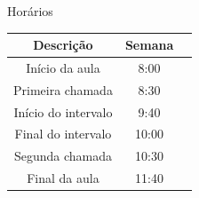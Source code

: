 

\begin{frame}{Horários}
    \vspace{1.0cm}
    \centering
    \begin{tabular}{|c|c|c|}
        \hline
        Descrição & Semana \\
        \hline
        Início da aula   & 8:00   \\
        Primeira chamada   & 8:30   \\
        Início do intervalo  & 9:40   \\
        Final do intervalo   & 10:00   \\
        Segunda chamada   & 10:30   \\
        Final da aula   & 11:40   \\
        \hline
    \end{tabular}
\end{frame}